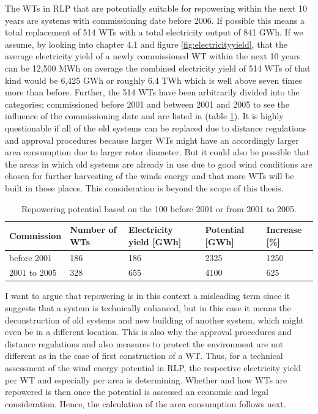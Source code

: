 \documentclass[a4paper,11pt]{article}
\begin{document}
The WTs in RLP that are potentially suitable for repowering within the next 10 years are systems with commissioning date before 2006. If possible this means a total replacement of 514 WTs with a total electricity output of 841 GWh. If we assume, by looking into chapter 4.1 and figure \ref{fig:electricityyield}, that the average electricity yield of a newly commissioned WT within the next 10 years can be 12,500 MWh on average the combined electricity yield of 514 WTs of that kind would be 6,425 GWh or roughly 6.4 TWh which is well above seven times more than before. Further, the 514 WTs have been arbitrarily divided into the categories; commissioned before 2001 and between 2001 and 2005 to see the influence of the commissioning date and are listed in (table \ref{tab:table1}). It is highly questionable if all of the old systems can be replaced due to distance regulations and approval procedures because larger WTs might have an accordingly larger area consumption due to larger rotor diameter. But it could also be possible that the areas in which old systems are already in use due to good wind conditions are chosen for further harvesting of the winds energy and that more WTs will be built in those places. This consideration is beyond the scope of this thesis.
\begin{table}[H]

\caption{\label{tab:table1}Repowering potential based on the 100 %
  before 2001 or from 2001 to 2005.}
\centering
\begin{tabular}[t]{lllll}
\toprule
Commission & Number of WTs & Electricity yield [GWh] & Potential [GWh] & Increase [\%]\\
\midrule
before 2001 & 186 & 186 & 2325 & 1250\\
2001 to 2005 & 328 & 655 & 4100 & 625\\
\midrule
\bottomrule
\end{tabular}
\end{table}
I want to argue that repowering is in this context a misleading term since it suggests that a system is technically enhanced, but in this case it means the deconstruction of old systems and new building of another system, which might even be in a different location. This is also why the approval procedures and distance regulations and also measures to protect the environment are not different as in the case of first construction of a WT. Thus, for a technical assessment of the wind energy potential in RLP, the respective electricity yield per WT and especially per area is determining. Whether and how WTs are repowered is then once the potential is assessed an economic and legal consideration. Hence, the calculation of the area consumption follows next.
\end{document}
